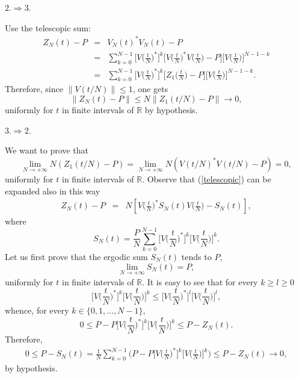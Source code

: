 \documentclass[aip,jmp,12pt
]{revtex4}
\newcommand{\RM}{\mathbb{R}}
\theoremstyle{definition}
\begin{document}
$2. \Rightarrow 3.$

Use  the telescopic sum:
\begin{eqnarray}
Z_N(t)-P &=& V_{N}(t)^{*}V_{N}(t)-P
\nonumber \\
                          & = & \sum_{k=0}^{N-1}\Big[V\Big(\frac{t}{N}\Big)^*\Big]^k \Big[V\Big(\frac{t}{N}\Big)^*V\Big(\frac{t}{N}\Big)-P\Big]\Big[V\Big(\frac{t}{N}\Big)\Big]^{N-1-k} \nonumber\\
                          & = & \sum_{k=0}^{N-1}\Big[V\Big(\frac{t}{N}\Big)^*\Big]^k \Big[Z_1\Big(\frac{t}{N}\Big)-P \Big]\Big[V\Big(\frac{t}{N}\Big)\Big]^{N-1-k}.
\label{telescopic}
\end{eqnarray}
Therefore, since $\| V(t/N)\|\leq 1$, one gets
\[
\left\|Z_{N}(t)-P\right\| \leq N \left\|
Z_1(t/N) -P \right\| \to  0 ,
\]
uniformly for $t$ in finite intervals of $\RM$ by hypothesis.

$3. \Rightarrow 2.$

We want to prove that
\begin{equation}\label{deriv2}
\lim_{N \to + \infty} N(Z_1(t/N)-P)=
\lim_{N \to + \infty} N(V(t/N)^* V(t/N)-P)=0,
\end{equation}
uniformly for $t$ in finite intervals of $\RM$. Observe that
(\ref{telescopic}) can be expanded also in this way
\begin{eqnarray}
Z_N(t)-P
&=&  N \left[
V\Big(\frac{t}{N}\Big)^* S_N(t) V\Big(\frac{t}{N}\Big) - S_N(t) \right],
\label{telescopic2}
\end{eqnarray}
where
\begin{equation*}
S_N(t)=\frac{P}{N}\sum_{k=0}^{N-1}\Big[V\Big(\frac{t}{N}\Big)^*\Big]^k \Big[V\Big(\frac{t}{N}\Big)\Big]^k.
\end{equation*}
Let us first prove that the  ergodic sum $S_N(t)$ tends to $P$,
\[
\lim_{N \to +\infty} S_N(t)=P,
\]
uniformly for $t$ in finite intervals of $\RM$.  It is easy to see that
for every $k\geq l\geq 0$
\[
\Big[V\Big(\frac{t}{N}\Big)^*\Big]^k \Big[V\Big(\frac{t}{N}\Big)\Big]^k \leq \Big[V\Big(\frac{t}{N}\Big)^*\Big]^l \Big[V\Big(\frac{t}{N}\Big)\Big]^l ,
\]
whence, for every $k \in \{ 0,1, \ldots, N-1\}$,
\[
0 \leq P- P \Big[V\Big(\frac{t}{N}\Big)^*\Big]^k \Big[V\Big(\frac{t}{N}\Big)\Big]^k \leq P- Z_N(t) .
\]
Therefore,
\begin{eqnarray*}
0 \leq P- S_N(t) =\frac{1}{N} \sum_{k=0}^{N-1}\Big( P- P \Big[V\Big(\frac{t}{N}\Big)^*\Big]^k \Big[V\Big(\frac{t}{N}\Big)\Big]^k\Big) \leq P- Z_N(t) \to 0,
\end{eqnarray*}
by hypothesis.
\end{document}
